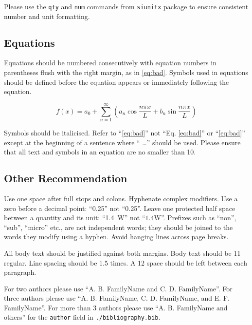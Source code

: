 \documentclass[a4paper,11pt]{article}
\begin{document}
Please use the \texttt{qty} and \texttt{num} commands from \texttt{siunitx}
package to ensure consistent number and unit formatting. 

\subsection{Equations}

Equations should be numbered consecutively with equation numbers in parentheses
flush with the right margin, as in \eqref{eq:bad}. Symbols used in equations
should be defined before the equation appears or immediately following the
equation. 

\begin{equation}\label{eq:bad}
  f(x) = a_{0} + \sum_{n = 1}^{\infty} \left( a_{n} \cos \frac{n\pi x}{L} + b_{n} \sin \frac{n\pi x}{L}\right)
\end{equation}

Symbols should be italicised. Refer to ``\eqref{eq:bad}'' not
``Eq. \eqref{eq:bad}'' or ``\cref{eq:bad}'' except at the beginning of 
a sentence where `` \dots'' should be used. Please ensure that all
text and symbols in an equation are no smaller than \qty{10}{\point}.

\subsection{Other Recommendation}

Use one space after full stops and colons. Hyphenate complex modifiers. Use a
zero before a decimal point: ``\num{0.25}'' not
``\num[print-zero-integer=false]{0.25}''. Leave one protected half space between
a quantity and its unit: ``\qty{1.4}{\watt}'' not ``$1.4\mathrm{W}$''. Prefixes 
such as ``non'', ``sub'', ``micro'' etc., are not independent words; they
should be joined to the words they modify using a hyphen. Avoid hanging lines
across page breaks. 

\begin{acknowledgment}
All body text should be justified against both margins. Body text should be
\qty{11}{\point} regular. Line spacing should be \num{1.5} times. A
\qty{12}{\point} space should be left between each paragraph.
\end{acknowledgment}




For two authors please use ``A. B. FamilyName and C. D. FamilyName''. For three
authors please use ``A. B. FamilyName, C. D. FamilyName, and E. F.
FamilyName''. For more than \num{3} authors please use ``A. B. FamilyName and
others'' for the \texttt{author} field in \texttt{./bibliography.bib}. 
\end{document}
